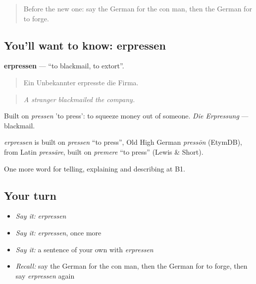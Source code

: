 \label{lesson:GE-C285-erpressen}



\begin{quote}
Before the new one: say the German for the con man, then the German for to forge.
\end{quote}

\subsection*{You'll want to know: erpressen}
\textbf{erpressen} — \textquotedblleft{}to blackmail, to extort\textquotedblright{}.

\begin{quote}
Ein Unbekannter erpresste die Firma.
\end{quote}

\begin{quote}
\emph{A stranger blackmailed the company.}
\end{quote}

Built on \emph{pressen} 'to press': to squeeze money out of someone. \emph{Die Erpressung} — blackmail.

\begin{cousinweb}
\emph{erpressen} is built on \emph{pressen} \textquotedblleft{}to press\textquotedblright{}, Old High German \emph{pressōn} (EtymDB), from Latin \emph{pressāre}, built on \emph{premere} \textquotedblleft{}to press\textquotedblright{} (Lewis \& Short).
\end{cousinweb}

\begin{grammarlens}[title={What you've built}]
One more word for telling, explaining and describing at B1.
\end{grammarlens}

\subsection*{Your turn}
\begin{itemize}
\raggedright
  \item \emph{Say it:} \emph{erpressen}
  \item \emph{Say it:} \emph{erpressen}, once more
  \item \emph{Say it:} a sentence of your own with \emph{erpressen}
  \item \emph{Recall:} say the German for the con man, then the German for to forge, then say \emph{erpressen} again
\end{itemize}

